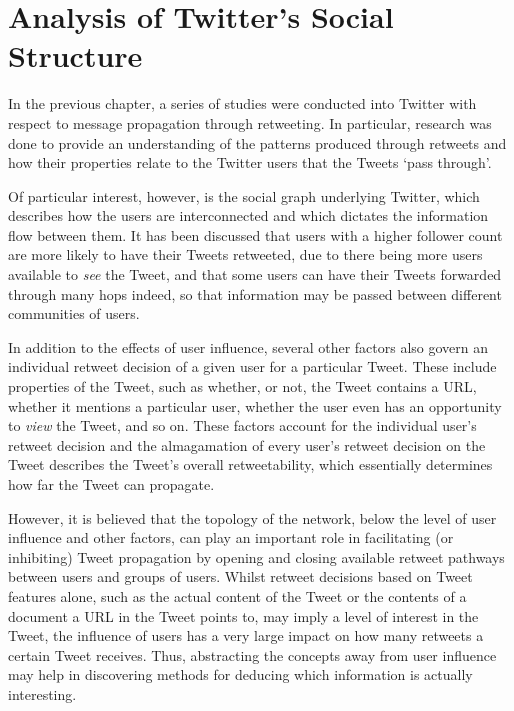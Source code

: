 \chapter{Analysis of Twitter's Social Structure}

In the previous chapter, a series of studies were conducted into Twitter with respect to message propagation through retweeting. In particular, research was done to provide an understanding of the patterns produced through retweets and how their properties relate to the Twitter users that the Tweets `pass through'.

Of particular interest, however, is the social graph underlying Twitter, which describes how the users are interconnected and which dictates the information flow between them. It has been discussed that users with a higher follower count are more likely to have their Tweets retweeted, due to there being more users available to \textit{see} the Tweet, and that some users can have their Tweets forwarded through many hops indeed, so that information may be passed between different communities of users.

In addition to the effects of user influence,  several other factors also govern an individual retweet decision of a given user for a particular Tweet. These include properties of the Tweet, such as whether, or not, the Tweet contains a URL, whether it mentions a particular user, whether the user even has an opportunity to \textit{view} the Tweet, and so on. These factors account for the individual user's retweet decision and the almagamation of every user's retweet decision on the Tweet describes the Tweet's overall retweetability, which essentially determines how far the Tweet can propagate.

However, it is believed that the topology of the network, below the level of user influence and other factors, can play an important role in facilitating (or inhibiting) Tweet propagation by opening and closing available retweet pathways between users and groups of users. Whilst retweet decisions based on Tweet features alone, such as the actual content of the Tweet or the contents of a document a URL in the Tweet points to, may imply a level of interest in the Tweet, the influence of users has a very large impact on how many retweets a certain Tweet receives. Thus, abstracting the concepts away from user influence may help in discovering methods for deducing which information is actually interesting.

